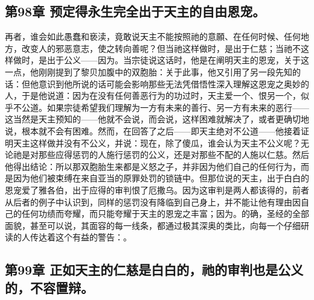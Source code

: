 \subsection{第98章 预定得永生完全出于天主的自由恩宠。}

再者，谁会如此愚蠢和亵渎，竟敢说天主不能按照祂的意願、在任何时候、任何地方，改变人的邪恶意志，使之转向善呢？但当祂这样做时，是出于仁慈；当祂不这样做时，是出于公义——因为。当宗徒说这话时，他是在阐明天主的恩宠，关于这一点，他刚刚提到了黎贝加腹中的双胞胎：关于此事，他又引用了另一段先知的话：但他意识到他所说的话可能会影响那些无法凭借悟性深入理解这恩宠之奥妙的人，于是他说道：因为在没有任何善恶行为的功过时，天主爱一个、恨另一个，似乎不公道。如果宗徒希望我们理解为一方有未来的善行、另一方有未来的恶行——这当然是天主预知的——他就不会说，而会说，这样困难就解决了，或者更确切地说，根本就不会有困难。然而，在回答了之后——即天主绝对不公道——他接着证明天主这样做并没有不公义，并说：现在，除了傻瓜，谁会认为天主不公义呢？无论祂是对那些应得惩罚的人施行惩罚的公义，还是对那些不配的人施以仁慈。然后他得出结论：所以那双胞胎生来都是义怒之子，并非因为他们自己的任何行为，而是因为他们被束缚在来自亚当的原罪处罚的锁链中。但那位说的天主，出于白白的恩宠爱了雅各伯，出于应得的审判恨了厄撒乌。因为这审判是两人都该得的，前者从后者的例子中认识到，同样的惩罚没有降临到自己身上，并不能让他有理由因自己的任何功绩而夸耀，而只能夸耀于天主的恩宠之丰富；因为。的确，圣经的全部面貌，甚至可以说，其面容的每一线条，都通过极其深奥的类比，向每一个仔细研读的人传达着这个有益的警告：。\par


\subsection{第99章 正如天主的仁慈是白白的，祂的审判也是公义的，不容置辩。}

